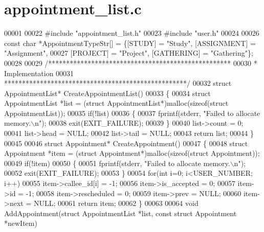 \section{appointment\+\_\+list.\+c}
\label{appointment__list_8c_source}

\begin{DoxyCode}
00001 
00022 \textcolor{preprocessor}{#include "appointment_list.h"}
00023 \textcolor{preprocessor}{#include "user.h"}
00024 
00026 \textcolor{keyword}{const} \textcolor{keywordtype}{char} *AppointmentTypeStr[] = \{[STUDY] = \textcolor{stringliteral}{"Study"}, [ASSIGNMENT] = \textcolor{stringliteral}{"Assignment"},
00027     [PROJECT] = \textcolor{stringliteral}{"Project"}, [GATHERING] = \textcolor{stringliteral}{"Gathering"}\};
00028 
00029 \textcolor{comment}{/***************************************************}
00030 \textcolor{comment}{ * Implementation}
00031 \textcolor{comment}{ ***************************************************/}
00032 \textcolor{keyword}{struct }AppointmentList* CreateAppointmentList()
00033 \{
00034     \textcolor{keyword}{struct }AppointmentList *list = (\textcolor{keyword}{struct }AppointmentList*)malloc(\textcolor{keyword}{sizeof}(\textcolor{keyword}{struct} 
      AppointmentList));
00035     \textcolor{keywordflow}{if}(!list)
00036     \{
00037         fprintf(stderr, \textcolor{stringliteral}{"Failed to allocate memory.\(\backslash\)n"});
00038         exit(EXIT\_FAILURE);
00039     \}
00040     list->count = 0;
00041     list->head = NULL;
00042     list->tail = NULL;
00043     \textcolor{keywordflow}{return} list;
00044 \}
00045 
00046 \textcolor{keyword}{struct }Appointment* CreateAppointment()
00047 \{
00048     \textcolor{keyword}{struct }Appointment *item = (\textcolor{keyword}{struct }Appointment*)malloc(\textcolor{keyword}{sizeof}(\textcolor{keyword}{struct} 
      Appointment));
00049     \textcolor{keywordflow}{if}(!item)
00050     \{
00051         fprintf(stderr, \textcolor{stringliteral}{"Failed to allocate memory.\(\backslash\)n"});
00052         exit(EXIT\_FAILURE);
00053     \}
00054     \textcolor{keywordflow}{for}(\textcolor{keywordtype}{int} i=0; i<USER_NUMBER; i++)
00055         item->callee_id[i] = -1;
00056     item->is_accepted = 0;
00057     item->id = -1;
00058     item->rescheduled = 0;
00059     item->prev = NULL;
00060     item->next = NULL;
00061     \textcolor{keywordflow}{return} item;
00062 \}
00063 
00064 \textcolor{keywordtype}{void} AddAppointment(\textcolor{keyword}{struct} AppointmentList *list, \textcolor{keyword}{const} \textcolor{keyword}{struct} Appointment *newItem)

\end{DoxyCode}

